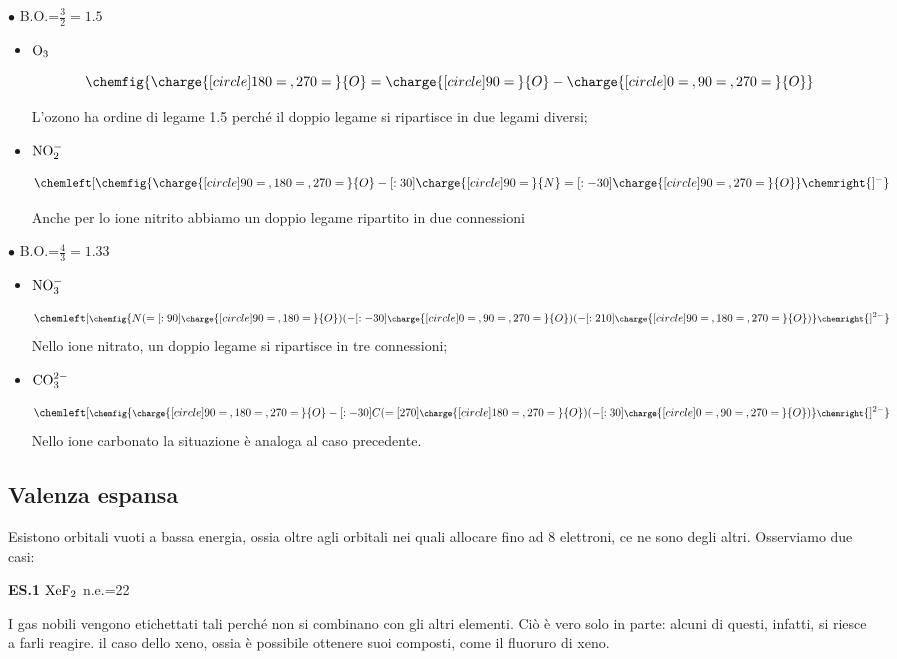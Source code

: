     $\bullet$ B.O.=$\frac{3}{2}=1.5$
    \begin{itemize}
        \item $\rm O_3$
        
        $$
        \chemfig{\charge{[circle]180=\:,270=\:}{O}=\charge{[circle]90=\:}{O}-\charge{[circle]0=\:,90=\:,270=\:}{O}}
        $$

        L'ozono ha ordine di legame 1.5 perché il doppio legame si ripartisce in due legami diversi;
        \item $\rm NO_2^-$
        
        $$
        \chemleft[ \chemfig{\charge{[circle]90=\:,180=\:,270=\:}{O}-[:30]\charge{[circle]90=\:}{N}=[:-30]\charge{[circle]90=\:,270=\:}{O}} \chemright{]^{-}}
        $$

        Anche per lo ione nitrito abbiamo un doppio legame ripartito in due connessioni
    \end{itemize}

    $\bullet$ B.O.=$\frac{4}{3}=1.33$
    \begin{itemize}
        \item $\rm NO_3^-$
        
        $$
        \chemleft[ \footnotesize\chemfig{N(=[:90]\charge{[circle]90=\:,180=\:}{O})(-[:-30]\charge{[circle]0=\:,90=\:,270=\:}{O})(-[:210]\charge{[circle]90=\:,180=\:,270=\:}{O})} \chemright{]^{2-}}
        $$
        Nello ione nitrato, un doppio legame si ripartisce in tre connessioni;
        \item $\rm CO_3^{2-}$
        
        $$
        \chemleft[ \footnotesize\chemfig{\charge{[circle]90=\:,180=\:,270=\:}{O}-[:-30]C(=[270]\charge{[circle]180=\:,270=\:}{O})(-[:30]\charge{[circle]0=\:,90=\:,270=\:}{O})} \chemright{]^{2-}}
        $$
        Nello ione carbonato la situazione è analoga al caso precedente.
    \end{itemize}
\normalsize
\subsection{Valenza espansa}
Esistono orbitali vuoti a bassa energia, ossia oltre agli orbitali nei quali allocare fino ad 8 elettroni, ce ne sono degli altri. Osserviamo due casi:

\vspace{0.2cm}\textbf{ES.1} $\rm XeF_2$ n.e.=22

I gas nobili vengono etichettati tali perché non si combinano con gli altri elementi. Ciò è vero solo in parte: alcuni di questi, infatti, si riesce a farli reagire. \E il caso dello xeno, ossia è possibile ottenere suoi composti, come il fluoruro di xeno.

